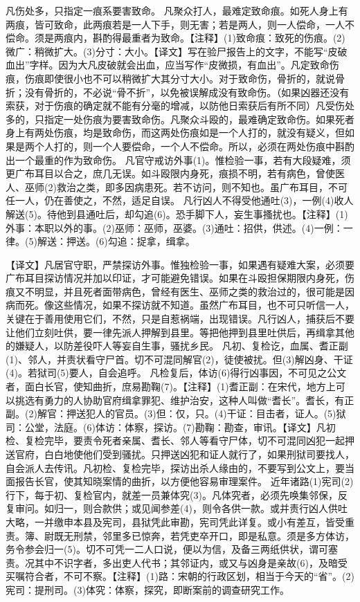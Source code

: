 \documentclass[12pt,UTF8]{ctexbook}
\begin{document}
凡伤处多，只指定一痕系要害致命。
凡聚众打人，最难定致命痕。如死人身上有两痕，皆可致命，此两痕若是一人下手，则无害；若是两人，则一人偿命，一人不偿命。须是两痕内，斟酌得最重者为致命。【注释】(1)致命痕：致死的伤痕。(2)微广：稍微扩大。(3)分寸：大小。【译文】写在验尸报告上的文字，不能写“皮破血出”字样。因为大凡皮破就会出血，应当写作“皮微损，有血出”。凡定致命伤痕，伤痕即使很小也不可以稍微扩大其分寸大小。对于致命伤，骨折的，就说骨折；没有骨折的，不必说“骨不折”，以免被误解成没有致命伤。（如果凶器还没有索获，对于伤痕的确定就不能有分毫的增减，以防他日索获后有所不同）凡受伤处多的，只指定一处伤痕为要害致命伤。凡聚众斗殴的，最难确定致命伤。如果死者身上有两处伤痕，均是致命伤，而这两处伤痕如是一个人打的，就没有疑义，但如果是两个人打的，则一个人要偿命，一个人不偿命。所以，必须在两处伤痕中斟酌出一个最重的作为致命伤。
凡官守戒访外事(1)。惟检验一事，若有大段疑难，须更广布耳目以合之，庶几无误。如斗殴限内身死，痕损不明，若有病色，曾使医人、巫师(2)救治之类，即多因病患死。若不访问，则不知也。虽广布耳目，不可任一人，仍在善使之，不然，适足自误。
凡行凶人不得受他通吐(3)，一例(4)收人解送(5)。待他到县通吐后，却勾追(6)。恐手脚下人，妄生事搔扰也。【注释】(1)外事：本职以外的事。(2)巫师：巫师，巫婆。(3)通吐：招供，供述。(4)一例：一律。(5)解送：押送。(6)勾追：捉拿，缉拿。

【译文】凡居官守职，严禁探访外事。惟独检验一事，如果遇有疑难大案，必须要广布耳目探访情况并加以印证，才可能避免错误。如果在斗殴担保期限内身死，伤痕又不明显，并且死者面带病色，曾经有医生、巫师之类的救治过的，很可能是因病而死。像这些情况，如果不探访就不知道。虽然广布耳目，也不可只听信一人，关键在于善用使用它们，不然，只是自惹祸端，出现错误。凡行凶人，捕获后不要让他们立刻吐供，要一律先派人押解到县里。等把他押到县里吐供后，再缉拿其他的嫌疑人，以防差役吓人等妄自生事，骚扰乡民。
凡初、复检讫，血属、耆正副(1)、邻人，并责状看守尸首。切不可混同解官(2)，徒使被扰。但(3)解凶身、干证(4)。若狱司(5)要人，自会追呼。
凡检复后，体访(6)得行凶事因，不可见之公文者，面白长官，使知曲折，庶易勘鞠(7)。【注释】(1)耆正副：在宋代，地方上可以挑选有勇力的人协助官府缉拿罪犯、维护治安，这种人叫做“耆长”。耆长，有正副。(2)解官：押送犯人的官员。(3)但：仅，只。(4)干证：目击者，证人。(5)狱司：公堂，法庭。(6)体访：体察，探访。(7)勘鞠：勘查，审讯。【译文】凡初检、复检完毕，要责令死者亲属、耆长、邻人等看守尸体，切不可混同凶犯一起押送官府，白白地使他们受到骚扰。只押送凶犯和证人就行了，如果刑狱司要找人，自会派人去传讯。凡初检、复检完毕，探访出杀人缘由的，不要写到公文上，要当面报告长官，使其知晓案情的曲折，以方便他容易审理案件。
近年诸路(1)宪司(2)行下，每于初、复检官内，就差一员兼体究(3)。凡体究者，必须先唤集邻保，反复审问。如归一，则合款供；或见闻参差(4)，则令各供一款。或并责行凶人供吐大略，一并缴申本县及宪司，县狱凭此审勘，宪司凭此详复。或小有差互，皆受重责。簿、尉既无刑禁，邻里多已惊奔，若凭吏卒开口，即是私意。须是多方体访，务令参会归一(5)。切不可凭一二人口说，便以为信，及备三两纸供状，谓可塞责。况其中不识字者，多出吏人代书；其邻证内，或又与凶身是亲故(6)，及暗受买嘱符合者，不可不察。【注释】(1)路：宋朝的行政区划，相当于今天的“省”。(2)宪司：提刑司。(3)体究：体察，探究，即断案前的调查研究工作。
\end{document}
